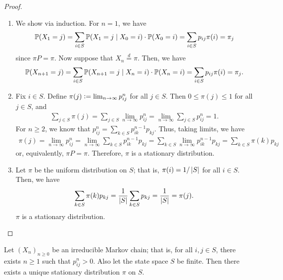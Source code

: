 \begin{proof}
    \begin{enumerate}
        \item We show via induction. For $n = 1$, we have
        \begin{align}
            \mathbb{P}(X_{1} = j) = \sum_{i \in S} \mathbb{P}(X_{1} = j \mid X_{0} = i) \cdot \mathbb{P}(X_{0} = i) = \sum_{i \in S} p_{ij}\pi(i) = \pi_{j}
        \end{align}
        since $\pi P = \pi$. Now suppose that $X_{n} \overset{d}{=} \pi$. Then, we have
        \begin{align}
            \mathbb{P}(X_{n+1} = j) = \sum_{i \in S} \mathbb{P}(X_{n+1} = j \mid X_{n} = i) \cdot \mathbb{P}(X_{n} = i) = \sum_{i \in S} p_{ij}\pi(i) = \pi_{j}.
        \end{align}

        \item Fix $i \in S$. Define $\pi(j) \vcentcolon= \lim_{n \to \infty} p_{ij}^{n}$ for all $j \in S$. Then $0 \leq \pi(j) \leq 1$ for all $j \in S$, and
        \begin{align}
            \sum_{j \in S} \pi(j) = \sum_{j \in S} \lim_{n \to \infty} p_{ij}^{n} = \lim_{n \to \infty} \sum_{j \in S} p_{ij}^{n} = 1.
        \end{align}
        For $n \geq 2$, we know that $p_{ij}^{n} = \sum_{k \in S} p_{ik}^{n-1}p_{kj}$. Thus, taking limits, we have
        \begin{align}
            \pi(j) = \lim_{n \to \infty} p_{ij}^{n} = \lim_{n \to \infty} \sum_{k \in S} p_{ik}^{n-1}p_{kj} = \sum_{k \in S} \lim_{n \to \infty} p_{ik}^{n-1}p_{kj} = \sum_{k \in S} \pi(k)p_{kj}
        \end{align}
        or, equivalently, $\pi P = \pi$. Therefore, $\pi$ is a stationary distribution.

        \item Let $\pi$ be the uniform distribution on $S$; that is, $\pi(i) = 1/\left| S \right|$ for all $i \in S$. Then, we have
        \begin{align}
            \sum_{k \in S} \pi(k) p_{kj} = \frac{1}{\left| S \right|} \sum_{k \in S} p_{kj} = \frac{1}{\left| S \right|} = \pi(j).
        \end{align}
        $\pi$ is a stationary distribution.
    \end{enumerate}
\end{proof}

\begin{theorem}
    Let $(X_{n})_{n \geq 0}$ be an irreducible Markov chain; that is, for all $i,j \in S$, there exists $n \geq 1$ such that $p_{ij}^{n} > 0$. Also let the state space $S$ be finite. Then there exists a unique stationary distribution $\pi$ on $S$.
\end{theorem}

